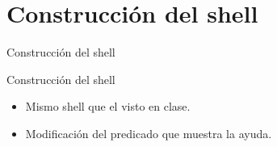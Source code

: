 \section{Construcción del shell}
\begin{frame}
\end{frame}

\begin{frame}{Construcción del shell}
 \begin{block}{Construcción del shell}
  \begin{itemize}
   \item Mismo shell que el visto en clase.
   \item Modificación del predicado que muestra la ayuda.
  \end{itemize}
 \end{block}
\end{frame}
